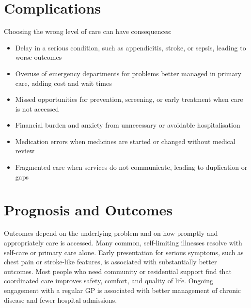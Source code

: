 \section*{Complications}
Choosing the wrong level of care can have consequences:
\begin{itemize}
    \item Delay in a serious condition, such as appendicitis, stroke, or sepsis, leading to worse outcomes
    \item Overuse of emergency departments for problems better managed in primary care, adding cost and wait times
    \item Missed opportunities for prevention, screening, or early treatment when care is not accessed
    \item Financial burden and anxiety from unnecessary or avoidable hospitalisation
    \item Medication errors when medicines are started or changed without medical review
    \item Fragmented care when services do not communicate, leading to duplication or gaps
\end{itemize}

\section*{Prognosis and Outcomes}
Outcomes depend on the underlying problem and on how promptly and appropriately care is accessed. Many common, self-limiting illnesses resolve with self-care or primary care alone. Early presentation for serious symptoms, such as chest pain or stroke-like features, is associated with substantially better outcomes. Most people who need community or residential support find that coordinated care improves safety, comfort, and quality of life. Ongoing engagement with a regular GP is associated with better management of chronic disease and fewer hospital admissions.

